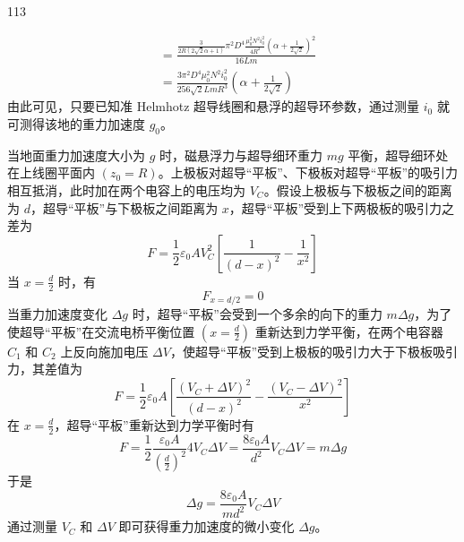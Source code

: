 \begin{solution}{113}
\begin{subsolution}
\begin{subsubsolution}
\begin{equation}
\begin{aligned}
                    &= \frac{\frac{3}{2 R (2 \sqrt{2} \alpha + 1)} \pi^{2} D^{4} \frac{\mu_{0}^{2} N^{2} i_{0}^{2}}{4 R^{2}} (\alpha + \frac{1}{2 \sqrt{2}})^{2}}{16 L m} \\
                    &= \frac{3 \pi^{2} D^{4} \mu_{0}^{2} N^{2} i_{0}^{2}}{256 \sqrt{2} L m R^{3}} \left(\alpha + \frac{1}{2 \sqrt{2}}\right)
                \end{aligned}
                \label{eq:16.s113}
            \end{equation}
            由此可见，只要已知准 Helmhotz 超导线圈和悬浮的超导环参数，通过测量 $i_{0}$ 就可测得该地的重力加速度 $g_{0}$。
        \end{subsubsolution}
    \end{subsolution}
    \begin{subsolution}
        当地面重力加速度大小为 $g$ 时，磁悬浮力与超导细环重力 $mg$ 平衡，超导细环处在上线圈平面内 $(z_{0}=R)$。上极板对超导“平板”、下极板对超导“平板”的吸引力相互抵消，此时加在两个电容上的电压均为 $V_{C}$。假设上极板与下极板之间的距离为 $d$，超导“平板”与下极板之间距离为 $x$，超导“平板”受到上下两极板的吸引力之差为
        \begin{equation}
            F = \frac{1}{2} \varepsilon_{0} A V_{C}^{2} \left[ \frac{1}{(d - x)^{2}} - \frac{1}{x^{2}} \right]
        \end{equation}
        当 $x = \frac{d}{2}$ 时，有
        \begin{equation}
            F_{x = d/2} = 0
            \label{eq:17.s113}
        \end{equation}
        当重力加速度变化 $\Delta g$ 时，超导“平板”会受到一个多余的向下的重力 $m\Delta g$，为了使超导“平板”在交流电桥平衡位置 $\left(x=\frac{d}{2}\right)$ 重新达到力学平衡，在两个电容器 $C_{1}$ 和 $C_{2}$ 上反向施加电压 $\Delta V$，使超导“平板”受到上极板的吸引力大于下极板吸引力，其差值为
        \begin{equation}
            F = \frac{1}{2} \varepsilon_{0} A \left[ \frac{(V_{C} + \Delta V)^{2}}{(d - x)^{2}} - \frac{(V_{C} - \Delta V)^{2}}{x^{2}} \right]
            \label{eq:18.s113}
        \end{equation}
        在 $x = \frac{d}{2}$，超导“平板”重新达到力学平衡时有
        \begin{equation}
            F = \frac{1}{2} \frac{\varepsilon_{0} A}{\left(\frac{d}{2}\right)^{2}} 4 V_{C} \Delta V = \frac{8 \varepsilon_{0} A}{d^{2}} V_{C} \Delta V = m \Delta g
            \label{eq:19.s113}
        \end{equation}
        于是
        \begin{equation}
            \Delta g = \frac{8 \varepsilon_{0} A}{m d^{2}} V_{C} \Delta V
            \label{eq:20.s113}
        \end{equation}
        通过测量 $V_{C}$ 和 $\Delta V$ 即可获得重力加速度的微小变化 $\Delta g$。
    \end{subsolution}
\end{solution}